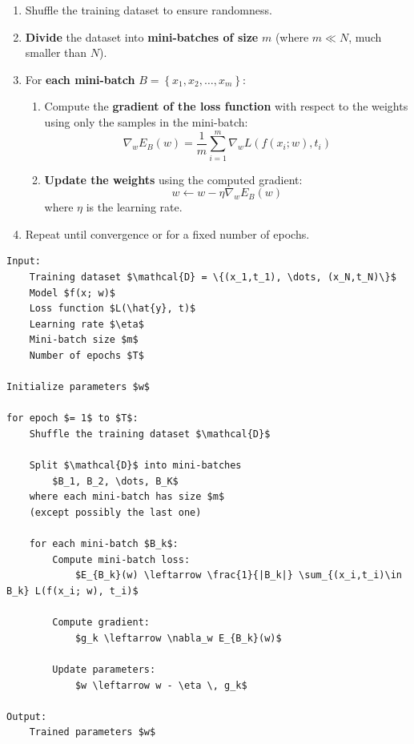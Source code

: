 \begin{enumerate}
    \item Shuffle the training dataset to ensure randomness.
    \item \textbf{Divide} the dataset into \textbf{mini-batches of size} $m$ (where $m \ll N$, much smaller than $N$).
    \item For \textbf{each mini-batch} $B = \left\{ x_1, x_2, \ldots, x_m \right\}$:
    \begin{enumerate}
        \item Compute the \textbf{gradient of the loss function} with respect to the weights using only the samples in the mini-batch:
        \begin{equation*}
            \nabla_w E_B(w) = \frac{1}{m} \sum_{i=1}^{m} \nabla_w L\left(f\left(x_i; w\right), t_i\right)
        \end{equation*}
        \item \textbf{Update the weights} using the computed gradient:
        \begin{equation*}
            w \leftarrow w - \eta \nabla_w E_B(w)
        \end{equation*}
        where $\eta$ is the learning rate.
    \end{enumerate}
    \item Repeat until convergence or for a fixed number of epochs.
\end{enumerate}

\begin{lstlisting}[language=pseudo-code,mathescape=true,style={pseudocode-style},caption={Mini-Batch Gradient Descent Algorithm}]
Input:
    Training dataset $\mathcal{D} = \{(x_1,t_1), \dots, (x_N,t_N)\}$
    Model $f(x; w)$
    Loss function $L(\hat{y}, t)$
    Learning rate $\eta$
    Mini-batch size $m$
    Number of epochs $T$

Initialize parameters $w$

for epoch $= 1$ to $T$:
    Shuffle the training dataset $\mathcal{D}$

    Split $\mathcal{D}$ into mini-batches
        $B_1, B_2, \dots, B_K$
    where each mini-batch has size $m$
    (except possibly the last one)

    for each mini-batch $B_k$:
        Compute mini-batch loss:
            $E_{B_k}(w) \leftarrow \frac{1}{|B_k|} \sum_{(x_i,t_i)\in B_k} L(f(x_i; w), t_i)$

        Compute gradient:
            $g_k \leftarrow \nabla_w E_{B_k}(w)$

        Update parameters:
            $w \leftarrow w - \eta \, g_k$

Output:
    Trained parameters $w$
\end{lstlisting}

